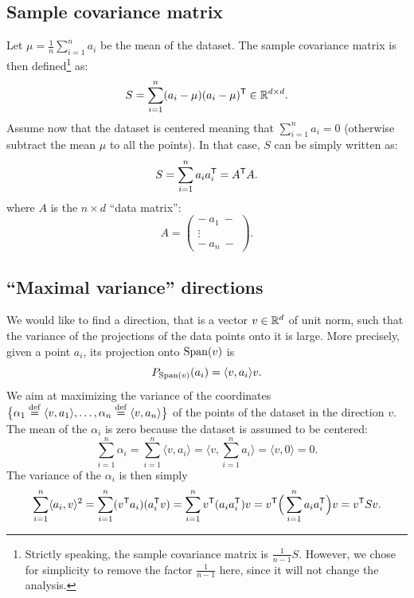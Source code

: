 \documentclass[11pt,nocut]{article}
\begin{document}
\subsection{Sample covariance matrix}

Let $\mu = \frac{1}{n} \sum_{i=1}^n a_i$ be the mean of the dataset. The sample covariance matrix is then defined\footnote{Strictly speaking, the sample covariance matrix is $\frac{1}{n-1}S$. However, we chose for simplicity to remove the factor $\frac{1}{n-1}$ here, since it will not change the analysis.} as:
$$
S = \sum_{i=1}^n (a_i - \mu) (a_i-\mu)^{{\sf T}} \in \mathbb{R}^{d \times d}.
$$
Assume now that the dataset is centered meaning that $\sum_{i=1}^n a_i = 0$ (otherwise subtract the mean $\mu$ to all the points). In that case, $S$ can be simply written as:
$$
S = \sum_{i=1}^n a_i a_i^{{\sf T}}
= A^{{\sf T}} A.
$$
where $A$ is the $n\times d$ ``data matrix'':
$$
A =
\begin{pmatrix}
	- \ a_1 \ - \\
	  \vdots  \\
	- \ a_n \ -
\end{pmatrix}
.
$$


\subsection{``Maximal variance'' directions}\label{sec:maximal_variance}


We would like to find a direction, that is a vector $v \in \mathbb{R}^d$ of unit norm, such that the variance of the projections of the data points onto it is large. More precisely, given a point $a_i$, its projection onto ${{\rm Span}}(v)$ is
$$
P_{{{\rm Span}}(v)}(a_i) = 
\langle v, a_i \rangle v.
$$
We aim at maximizing the variance of the coordinates $\big\{ \alpha_1 \overset{\rm def}{=} \langle v, a_1 \rangle, \dots , \alpha_n \overset{\rm def}{=} \langle v, a_n \rangle \big\}$ of the points of the dataset in the direction $v$. 
The mean of the $\alpha_i$ is zero because the dataset is assumed to be centered:
$$
\sum_{i=1}^n \alpha_i 
=
\sum_{i=1}^n \langle v, a_i \rangle
= \Big\langle v, \sum_{i=1}^n a_i \Big\rangle = \langle v,0 \rangle = 0.
$$
The variance of the $\alpha_i$ is then simply
$$
\sum_{i=1}^n \langle a_i, v \rangle^2
=
\sum_{i=1}^n (v^{{\sf T}}a_i)(a_i^{{\sf T}} v)
=
\sum_{i=1}^n v^{{\sf T}} (a_i a_i^{{\sf T}}) v
=
v^{{\sf T}} \Big(\sum_{i=1}^n a_i a_i^{{\sf T}}\Big) v
= v^{{\sf T}} S v.
$$
\end{document}
